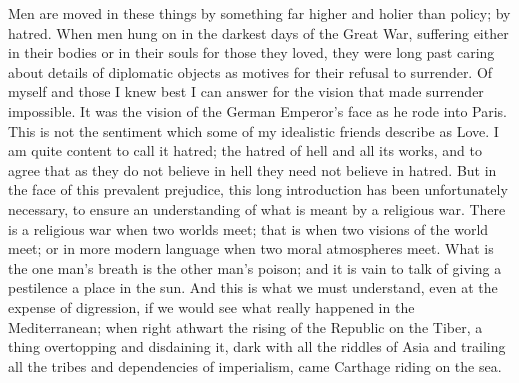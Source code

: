 Men are moved in these things by something far higher and holier than policy; by hatred. When men hung on in the darkest days of the Great War, suffering either in their bodies or in their souls for those they loved, they were long past caring about details of diplomatic objects as motives for their refusal to surrender. Of myself and those I knew best I can answer for the vision that made surrender impossible. It was the vision of the German Emperor's face as he rode into Paris. This is not the sentiment which some of my idealistic friends describe as Love. I am quite content to call it hatred; the hatred of hell and all its works, and to agree that as they do not believe in hell they need not believe in hatred. But in the face of this prevalent prejudice, this long introduction has been unfortunately necessary, to ensure an understanding of what is meant by a religious war. There is a religious war when two worlds meet; that is when two visions of the world meet; or in more modern language when two moral atmospheres meet. What is the one man's breath is the other man's poison; and it is vain to talk of giving a pestilence a place in the sun. And this is what we must understand, even at the expense of digression, if we would see what really happened in the Mediterranean; when right athwart the rising of the Republic on the Tiber, a thing overtopping and disdaining it, dark with all the riddles of Asia and trailing all the tribes and dependencies of imperialism, came Carthage riding on the sea.

